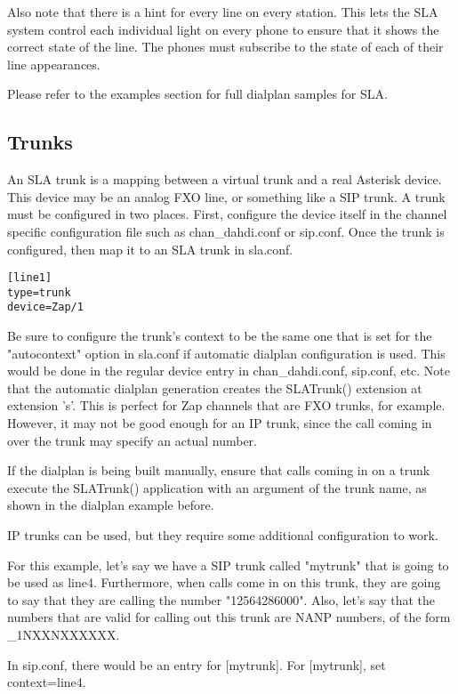 \documentclass[12pt,a4]{article}
\begin{document}
Also note that there is a hint for every line on every station.  This lets the SLA
system control each individual light on every phone to ensure that it shows the
correct state of the line.  The phones must subscribe to the state of each of their
line appearances.

Please refer to the examples section for full dialplan samples for SLA.

\subsection{Trunks}
\label{trunks}

An SLA trunk is a mapping between a virtual trunk and a real Asterisk device.
This device may be an analog FXO line, or something like a SIP trunk.  A trunk
must be configured in two places.  First, configure the device itself in the
channel specific configuration file such as chan_dahdi.conf or sip.conf.  Once the
trunk is configured, then map it to an SLA trunk in sla.conf.  

\begin{verbatim}
[line1]
type=trunk
device=Zap/1
\end{verbatim}

Be sure to configure the trunk's context to be the same one that is set for the
"autocontext" option in sla.conf if automatic dialplan configuration is used.
This would be done in the regular device entry in chan_dahdi.conf, sip.conf, etc.
Note that the automatic dialplan generation creates the SLATrunk() extension
at extension 's'.  This is perfect for Zap channels that are FXO trunks, for
example.  However, it may not be good enough for an IP trunk, since the call
coming in over the trunk may specify an actual number.

If the dialplan is being built manually, ensure that calls coming in on a trunk
execute the SLATrunk() application with an argument of the trunk name, as shown
in the dialplan example before.

IP trunks can be used, but they require some additional configuration to work.

For this example, let's say we have a SIP trunk called "mytrunk" that is going
to be used as line4.  Furthermore, when calls come in on this trunk, they are
going to say that they are calling the number "12564286000".  Also, let's say
that the numbers that are valid for calling out this trunk are NANP numbers,
of the form \_1NXXNXXXXXX.

In sip.conf,  there would be an entry for [mytrunk].  For [mytrunk], 
set context=line4.
\end{document}
